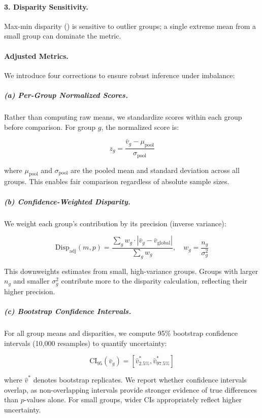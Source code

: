 \documentclass{article}
\begin{document}
\paragraph{3. Disparity Sensitivity.} Max-min disparity () is sensitive to outlier groups; a single extreme mean from a small group can dominate the metric.

\paragraph{Adjusted Metrics.} We introduce four corrections to ensure robust inference under imbalance:

\subparagraph{(a) Per-Group Normalized Scores.} Rather than computing raw means, we standardize scores within each group before comparison. For group $g$, the normalized score is:

\begin{equation}
z_g = \frac{\bar{v}_g - \mu_{\text{pool}}}{\sigma_{\text{pool}}}
\label{eq:zscore}
\end{equation}

where $\mu_{\text{pool}}$ and $\sigma_{\text{pool}}$ are the pooled mean and standard deviation across all groups. This enables fair comparison regardless of absolute sample sizes.

\subparagraph{(b) Confidence-Weighted Disparity.} We weight each group's contribution by its precision (inverse variance):

\begin{equation}
\text{Disp}_{\text{adj}}(m, p) = \frac{\sum_{g} w_g \cdot |\bar{v}_g - \bar{v}_{\text{global}}|}{\sum_{g} w_g}, \quad w_g = \frac{n_g}{\sigma_g^2}
\label{eq:weighted_disparity}
\end{equation}

This downweights estimates from small, high-variance groups. Groups with larger $n_g$ and smaller $\sigma_g^2$ contribute more to the disparity calculation, reflecting their higher precision.

\subparagraph{(c) Bootstrap Confidence Intervals.} For all group means and disparities, we compute 95\% bootstrap confidence intervals (10{,}000 resamples) to quantify uncertainty:

\begin{equation}
\text{CI}_{95}(\bar{v}_g) = \left[ \hat{v}^*_{2.5\%}, \hat{v}^*_{97.5\%} \right]
\end{equation}

where $\hat{v}^*$ denotes bootstrap replicates. We report whether confidence intervals overlap, as non-overlapping intervals provide stronger evidence of true differences than $p$-values alone. For small groups, wider CIs appropriately reflect higher uncertainty.
\end{document}
